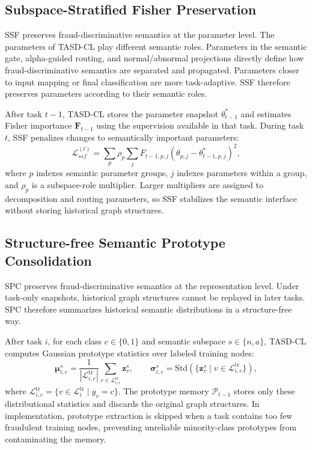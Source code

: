\subsection{Subspace-Stratified Fisher Preservation}
\label{subsec:ssf}

SSF preserves fraud-discriminative semantics at the parameter level. The parameters of TASD-CL play different semantic roles. Parameters in the semantic gate, alpha-guided routing, and normal/abnormal projections directly define how fraud-discriminative semantics are separated and propagated. Parameters closer to input mapping or final classification are more task-adaptive. SSF therefore preserves parameters according to their semantic roles.

After task $t-1$, TASD-CL stores the parameter snapshot $\theta^*_{t-1}$ and estimates Fisher importance $\mathbf{F}_{t-1}$ using the supervision available in that task. During task $t$, SSF penalizes changes to semantically important parameters:
\begin{equation}
\label{eq:ssf}
    \mathcal{L}_{ssf}^{(t)}
    =
    \sum_{p}
    \rho_p
    \sum_{j}
    F_{t-1,p,j}
    \left(
    \theta_{p,j}-\theta^{*}_{t-1,p,j}
    \right)^2,
\end{equation}
where $p$ indexes semantic parameter groups, $j$ indexes parameters within a group, and $\rho_p$ is a subspace-role multiplier. Larger multipliers are assigned to decomposition and routing parameters, so SSF stabilizes the semantic interface without storing historical graph structures.

\subsection{Structure-free Semantic Prototype Consolidation}
\label{subsec:spc}

SPC preserves fraud-discriminative semantics at the representation level. Under task-only snapshots, historical graph structures cannot be replayed in later tasks. SPC therefore summarizes historical semantic distributions in a structure-free way.

After task $i$, for each class $c\in\{0,1\}$ and semantic subspace $s\in\{n,a\}$, TASD-CL computes Gaussian prototype statistics over labeled training nodes:
\begin{equation}
    \boldsymbol{\mu}_{i,c}^{s}
    =
    \frac{1}{|\mathcal{L}^{\mathrm{tr}}_{i,c}|}
    \sum_{v\in\mathcal{L}^{\mathrm{tr}}_{i,c}}
    \mathbf{z}^{s}_v,
    \qquad
    \boldsymbol{\sigma}_{i,c}^{s}
    =
    \mathrm{Std}
    \left(
    \{\mathbf{z}^{s}_v \mid v\in\mathcal{L}^{\mathrm{tr}}_{i,c}\}
    \right),
\end{equation}
where $\mathcal{L}^{\mathrm{tr}}_{i,c}=\{v\in\mathcal{L}^{\mathrm{tr}}_i\mid y_v=c\}$. The prototype memory $\mathcal{P}_{t-1}$ stores only these distributional statistics and discards the original graph structures. In implementation, prototype extraction is skipped when a task contains too few fraudulent training nodes, preventing unreliable minority-class prototypes from contaminating the memory.

